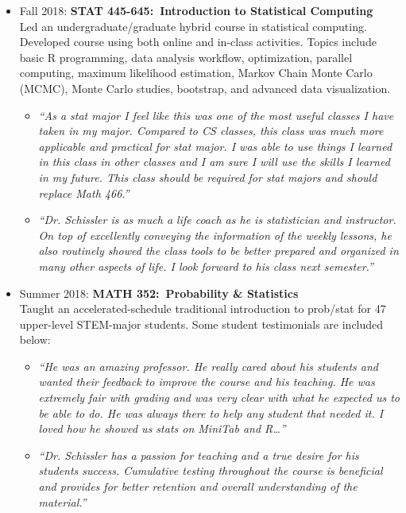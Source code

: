 \documentclass[paper=a4,fontsize=11pt]{scrartcl} %
\newcommand{\CourseEntry}[3]{
		\noindent \item{#1: \textbf{#2} \\ #3}}
\begin{document}
\begin{itemize}[noitemsep]
\CourseEntry{Fall 2018}{STAT 445-645:~Introduction to Statistical Computing}{Led an undergraduate/graduate hybrid course in statistical computing. Developed course using both online and in-class activities. Topics include basic R programming, data analysis workflow, optimization, parallel computing, maximum likelihood estimation, Markov Chain Monte Carlo (MCMC), Monte Carlo studies, bootstrap, and advanced data visualization.

\begin{itemize}
\item \emph{\small{``As a stat major I feel like this was one of the most useful classes I have taken in my major. Compared to CS classes, this class was much more applicable and practical for stat major. I was able to use things I learned in this class in other classes and I am sure I will use the skills I learned in my future. This class should be required for stat majors and should replace Math 466.''}}
\item \emph{\small{``Dr. Schissler is as much a life coach as he is statistician and instructor. On top of excellently conveying the information of the weekly lessons, he also routinely showed the class tools to be better prepared and organized in many other aspects of life. I look forward to his class next semester.''}}
\end{itemize}
}{} 

\CourseEntry{Summer 2018}{MATH 352:~Probability \& Statistics}{Taught an accelerated-schedule traditional introduction to prob/stat for 47 upper-level STEM-major students. Some student testimonials are included below:
\begin{itemize}
\item \emph{\small{``He was an amazing professor. He really cared about his students and wanted their feedback to improve the course and his teaching. He was extremely fair with grading and was very clear with what he expected us to be able to do. He was always there to help any student that needed it. I loved how he showed us stats on MiniTab and R\ldots''}}
\item \emph{\small{``Dr. Schissler has a passion for teaching and a true desire for his students success. Cumulative testing throughout the course is beneficial and provides for better retention and overall understanding of the material.''}}
\end{itemize}
}{} 


\end{itemize}
\end{document}
